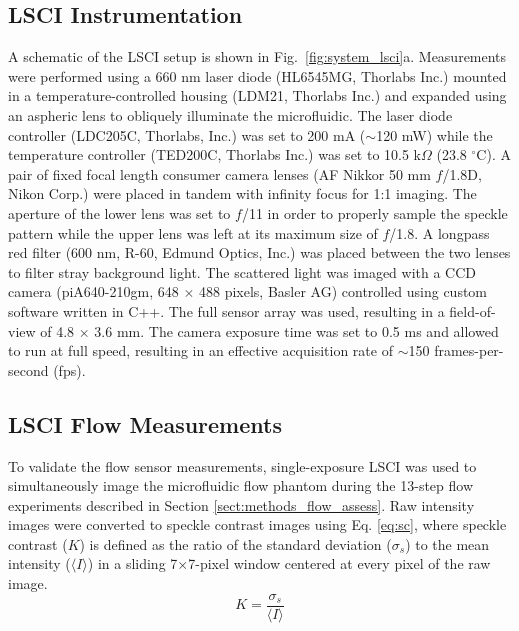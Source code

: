 \documentclass[12pt]{spieman}
\begin{document}
\begin{spacing}{2}
\subsection{LSCI Instrumentation}

A schematic of the LSCI setup is shown in Fig.~\ref{fig:system_lsci}a. Measurements were performed using a 660 nm laser diode (HL6545MG, Thorlabs Inc.) mounted in a temperature-controlled housing (LDM21, Thorlabs Inc.) and expanded using an aspheric lens to obliquely illuminate the microfluidic. The laser diode controller (LDC205C, Thorlabs, Inc.) was set to 200 mA ($\sim$120 mW) while the temperature controller (TED200C, Thorlabs Inc.) was set to 10.5 k$\Omega$ (23.8 $^\circ$C). A pair of fixed focal length consumer camera lenses (AF Nikkor 50 mm $f$/1.8D, Nikon Corp.) were placed in tandem with infinity focus for 1:1 imaging. The aperture of the lower lens was set to 
$f$/11 in order to properly sample the speckle pattern \cite{Kirkpatrick:2008ke} while the upper lens was left at its maximum size of $f$/1.8. A longpass red filter (600 nm, R-60, Edmund Optics, Inc.) was placed between the two lenses to filter stray background light. The scattered light was imaged with a CCD camera (piA640-210gm, 648 $\times$ 488 pixels, Basler AG) controlled using custom software written in C++. The full sensor array was used, resulting in a field-of-view of 4.8 $\times$ 3.6 mm. The camera exposure time was set to 0.5 ms 
and allowed to run at full speed, resulting in an effective acquisition rate of $\sim$150 frames-per-second (fps).


\subsection{LSCI Flow Measurements}
\label{sect:methods_lsci}

To validate the flow sensor measurements, single-exposure LSCI was used to simultaneously image the microfluidic flow phantom during the 13-step flow experiments described in Section \ref{sect:methods_flow_assess}. Raw intensity images were converted to speckle contrast images using Eq. \ref{eq:sc}, where speckle contrast ($K$) is defined as the ratio of the standard deviation ($\sigma_{s}$) to the mean intensity ($\langle{I}\rangle$) in a sliding 7$\times$7-pixel window centered at every pixel of the raw image.
%
\begin{equation}
    \label{eq:sc}
    K = \frac{\sigma_{s}}{\langle{I}\rangle}
\end{equation}


\end{spacing}
\end{document}

